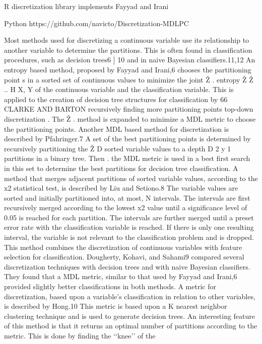 R discretization library implements Fayyad and Irani

Python https://github.com/navicto/Discretization-MDLPC

Most methods used for discretizing a continuous variable use its relationship
to another variable to determine the partitions. This is often found in
classification procedures, such as decision trees6 ] 10 and in naive Bayesian
classifiers.11,12
An entropy based method, proposed by Fayyad and Irani,6 chooses the
partitioning point s in a sorted set of continuous values to minimize the joint Ž .
entropy Ž Ž .. H X, Y of the continuous variable and the classification variable.
This is applied to the creation of decision tree structures for classification by
66 CLARKE AND BARTON
recursively finding more partitioning points top-down discretization . The Ž .
method is expanded to minimize a MDL metric to choose the partitioning
points.
Another MDL based method for discretization is described by Pfahringer.7
A set of the best partitioning points is determined by recursively partitioning the
Ž D sorted variable values to a depth D 2 y 1 partitions in a binary tree. Then .
the MDL metric is used in a best first search in this set to determine the best
partitions for decision tree classification.
A method that merges adjacent partitions of sorted variable values, according
to the x2 statistical test, is described by Liu and Setiono.8 The variable
values are sorted and initially partitioned into, at most, N intervals. The
intervals are first recursively merged according to the lowest x2 value until a
significance level of 0.05 is reached for each partition. The intervals are further
merged until a preset error rate with the classification variable is reached. If
there is only one resulting interval, the variable is not relevant to the classification
problem and is dropped. This method combines the discretization of
continuous variables with feature selection for classification.
Dougherty, Kohavi, and Sahami9 compared several discretization techniques
with decision trees and with naive Bayesian classifiers. They found that a
MDL metric, similar to that used by Fayyad and Irani,6 provided slightly better
classifications in both methods.
A metric for discretization, based upon a variable’s classification in relation
to other variables, is described by Hong.10 This metric is based upon a K
nearest neighbor clustering technique and is used to generate decision trees. An
interesting feature of this method is that it returns an optimal number of
partitions according to the metric. This is done by finding the ‘‘knee’’ of the
